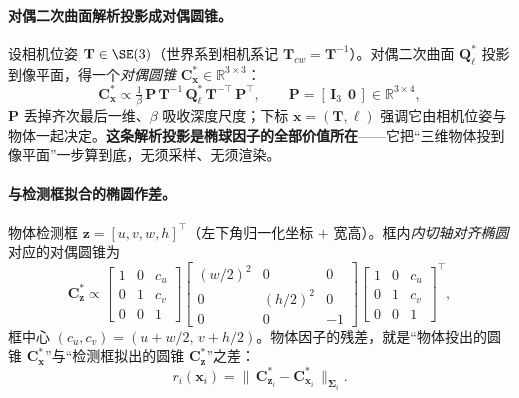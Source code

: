 \paragraph{对偶二次曲面解析投影成对偶圆锥。}
设相机位姿 $\mathbf{T}\in\SE(3)$（世界系到相机系记 $\mathbf{T}_{cw}=\mathbf{T}^{-1}$）。对偶二次曲面 $\mathbf{Q}_\ell^{*}$ 投影到像平面，得一个\emph{对偶圆锥} $\mathbf{C}^{*}_{\mathbf{x}}\in\mathbb{R}^{3\times3}$：
\begin{equation}
  \mathbf{C}^{*}_{\mathbf{x}}\propto\tfrac{1}{\beta}\,\mathbf{P}\,\mathbf{T}^{-1}\,\mathbf{Q}_\ell^{*}\,\mathbf{T}^{-\top}\,\mathbf{P}^\top,
  \qquad \mathbf{P}=[\,\mathbf{I}_3\ \ \mathbf{0}\,]\in\mathbb{R}^{3\times4},
  \label{eq:semantic-quadric-proj}
\end{equation}
$\mathbf{P}$ 丢掉齐次最后一维、$\beta$ 吸收深度尺度；下标 $\mathbf{x}=(\mathbf{T},\boldsymbol\ell)$ 强调它由相机位姿与物体一起决定\cite{rubino2018quadrics}。\textbf{这条解析投影是椭球因子的全部价值所在}——它把“三维物体投到像平面”一步算到底，无须采样、无须渲染。

\paragraph{与检测框拟合的椭圆作差。}
物体检测框 $\mathbf{z}=[u,v,w,h]^\top$（左下角归一化坐标 $+$ 宽高）。框内\emph{内切轴对齐椭圆}对应的对偶圆锥为
\begin{equation}
  \mathbf{C}^{*}_{\mathbf{z}}\propto
  \begin{bmatrix}1&0&c_u\\0&1&c_v\\0&0&1\end{bmatrix}
  \begin{bmatrix}(w/2)^2&0&0\\0&(h/2)^2&0\\0&0&-1\end{bmatrix}
  \begin{bmatrix}1&0&c_u\\0&1&c_v\\0&0&1\end{bmatrix}^\top,
  \label{eq:semantic-quadric-Cz}
\end{equation}
框中心 $(c_u,c_v)=(u{+}w/2,\,v{+}h/2)$。物体因子的残差，就是“物体投出的圆锥 $\mathbf{C}^{*}_{\mathbf{x}}$”与“检测框拟出的圆锥 $\mathbf{C}^{*}_{\mathbf{z}}$”之差：
\begin{equation}
  r_i(\mathbf{x}_i)=\big\|\,\mathbf{C}^{*}_{\mathbf{z}_i}-\mathbf{C}^{*}_{\mathbf{x}_i}\,\big\|_{\boldsymbol\Sigma_i}.
  \label{eq:semantic-quadric-residual}
\end{equation}

